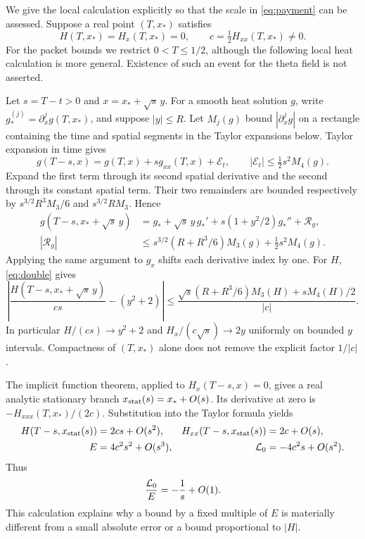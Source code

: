 We give the local calculation explicitly so that the scale in
\eqref{eq:payment} can be assessed. Suppose a real point $(T,x_*)$ satisfies
\begin{equation}\label{eq:double}
 H(T,x_*)=H_x(T,x_*)=0,\qquad c=\tfrac12H_{xx}(T,x_*)\ne0.
\end{equation}
For the packet bounds we restrict $0<T\le1/2$, although the following
local heat calculation is more general. Existence of such an event for
the theta field is not asserted.

Let $s=T-t>0$ and $x=x_*+\sqrt{s}\,y$. For a smooth heat solution $g$,
write $g_*^{(j)}=\partial_x^jg(T,x_*)$, and suppose $|y|\le R$.
Let $M_j(g)$ bound $|\partial_x^jg|$ on a rectangle containing the
time and spatial segments in the Taylor expansions below.
Taylor expansion in time gives
\[
 g(T-s,x)=g(T,x)+s g_{xx}(T,x)+\mathcal E_t,\qquad
 |\mathcal E_t|\le\tfrac12s^2M_4(g).
\]
Expand the first term through its second spatial derivative and the
second through its constant spatial term. Their two remainders are
bounded respectively by $s^{3/2}R^3M_3/6$ and $s^{3/2}RM_3$.
Hence
\begin{align}
 g(T-s,x_*+\sqrt{s}\,y)
 &=g_*+\sqrt{s}\,y\,g_*'
           +s(1+y^2/2)g_*''+\mathcal R_g,\label{eq:local}\\
 |\mathcal R_g|
 &\le s^{3/2}(R+R^3/6)M_3(g)+\tfrac12s^2M_4(g).\label{eq:local-error}
\end{align}
Applying the same argument to $g_x$ shifts each derivative index by one.
For $H$, \eqref{eq:double} gives
\begin{equation}\label{eq:collision-limit}
 \left|\frac{H(T-s,x_*+\sqrt{s}\,y)}{cs}-(y^2+2)\right|
 \le\frac{\sqrt{s}(R+R^3/6)M_3(H)+sM_4(H)/2}{|c|}.
\end{equation}
In particular $H/(cs)\to y^2+2$ and $H_x/(c\sqrt{s})\to2y$
uniformly on bounded $y$ intervals. Compactness of $(T,x_*)$ alone
does not remove the explicit factor $1/|c|$.

The implicit function theorem, applied to $H_x(T-s,x)=0$, gives a
real analytic stationary branch $x_{\rm stat}(s)=x_*+O(s)$.
Its derivative at zero is $-H_{xxx}(T,x_*)/(2c)$.
Substitution into the Taylor formula yields
\begin{align}
 H(T-s,x_{\rm stat}(s))&=2cs+O(s^2),&
 H_{xx}(T-s,x_{\rm stat}(s))&=2c+O(s),\notag\\
 E&=4c^2s^2+O(s^3),&
 \mathcal L_0&=-4c^2s+O(s^2).\label{eq:stationary}
\end{align}
Thus
\begin{equation}\label{eq:singular-ratio}
 \frac{\mathcal L_0}{E}=-\frac1s+O(1).
\end{equation}
This calculation explains why a bound by a fixed multiple of $E$ is
materially different from a small absolute error or a bound proportional
to $|H|$.

